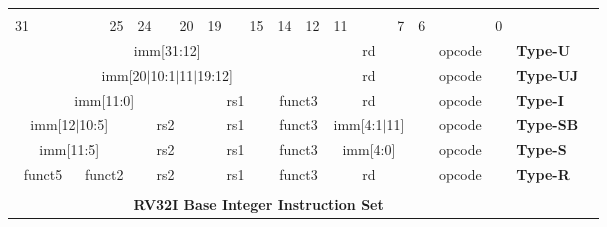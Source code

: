 \documentclass{report}
\begin{document}
\newpage
\begin{table}[p]
\begin{small}
\begin{center}
\begin{tabular}{p{0.05mm}p{0.05mm}p{0.05mm}p{0.05mm}p{0.05mm}p{0.05mm}p{0.05mm}p{0.05mm}p{0.05mm}p{0.05mm}p{0.05mm}p{0.05mm}p{0.05mm}p{0.05mm}p{0.05mm}p{0.05mm}p{0.05mm}p{0.05mm}p{0.05mm}p{0.05mm}p{0.05mm}p{0.05mm}p{0.05mm}p{0.05mm}p{0.05mm}p{0.05mm}p{0.05mm}p{0.05mm}p{0.05mm}p{0.05mm}p{0.05mm}p{0.05mm}p{50mm}l}& & & & & & & & & & & & & & & & & & & & & & & & & & & & & & & & & \\
\multicolumn{3}{l}{\scriptsize{31}} & \multicolumn{4}{r}{\scriptsize{25}} & \multicolumn{2}{l}{\scriptsize{24}} & \multicolumn{3}{r}{\scriptsize{20}} & \multicolumn{2}{l}{\scriptsize{19}} & \multicolumn{3}{r}{\scriptsize{15}} & \multicolumn{1}{l}{\scriptsize{14}} & \multicolumn{2}{r}{\scriptsize{12}} & \multicolumn{2}{l}{\scriptsize{11}} & \multicolumn{3}{r}{\scriptsize{7}} & \multicolumn{3}{l}{\scriptsize{6}} & \multicolumn{4}{r}{\scriptsize{0}} &  \\
\cline{1-32}
\multicolumn{20}{|c|}{imm[31:12]} & \multicolumn{5}{c|}{rd} & \multicolumn{7}{c|}{opcode} & \scriptsize{\bf Type-U} \\
\cline{1-32}
\multicolumn{20}{|c|}{imm[20$\vert$10:1$\vert$11$\vert$19:12]} & \multicolumn{5}{c|}{rd} & \multicolumn{7}{c|}{opcode} & \scriptsize{\bf Type-UJ} \\
\cline{1-32}
\multicolumn{12}{|c|}{imm[11:0]} & \multicolumn{5}{c|}{rs1} & \multicolumn{3}{c|}{funct3} & \multicolumn{5}{c|}{rd} & \multicolumn{7}{c|}{opcode} & \scriptsize{\bf Type-I} \\
\cline{1-32}
\multicolumn{7}{|c|}{imm[12$\vert$10:5]} & \multicolumn{5}{c|}{rs2} & \multicolumn{5}{c|}{rs1} & \multicolumn{3}{c|}{funct3} & \multicolumn{5}{c|}{imm[4:1$\vert$11]} & \multicolumn{7}{c|}{opcode} & \scriptsize{\bf Type-SB} \\
\cline{1-32}
\multicolumn{7}{|c|}{imm[11:5]} & \multicolumn{5}{c|}{rs2} & \multicolumn{5}{c|}{rs1} & \multicolumn{3}{c|}{funct3} & \multicolumn{5}{c|}{imm[4:0]} & \multicolumn{7}{c|}{opcode} & \scriptsize{\bf Type-S} \\
\cline{1-32}
\multicolumn{5}{|c|}{funct5} & \multicolumn{2}{c|}{funct2} & \multicolumn{5}{c|}{rs2} & \multicolumn{5}{c|}{rs1} & \multicolumn{3}{c|}{funct3} & \multicolumn{5}{c|}{rd} & \multicolumn{7}{c|}{opcode} & \scriptsize{\bf Type-R} \\
\cline{1-32}
\tabularnewline
\multicolumn{32}{c}{\bf RV32I Base Integer Instruction Set } & \\

\end{tabular}
\end{center}
\end{small}
\end{table}
\end{document}
